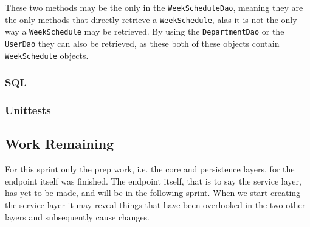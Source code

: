 These two methods may be the only in the \texttt{WeekScheduleDao}, meaning they are the only methods that directly retrieve a \texttt{WeekSchedule}, alas it is not the only way a \texttt{WeekSchedule} may be retrieved.
By using the \texttt{DepartmentDao} or the \texttt{UserDao} they can also be retrieved, as these both of these objects contain \texttt{WeekSchedule} objects.

\subsubsection{SQL}
\subsubsection{Unittests}

\subsection{Work Remaining}
For this sprint only the prep work, i.e. the core and persistence layers, for the endpoint itself was finished.
The endpoint itself, that is to say the service layer, has yet to be made, and will be in the following sprint.
When we start creating the service layer it may reveal things that have been overlooked in the two other layers and subsequently cause changes.
